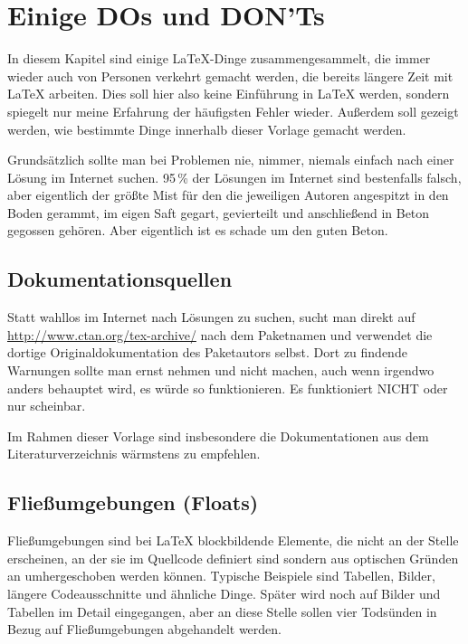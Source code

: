 \section{Einige DOs und DON'Ts}%
\label{sec:DOsAndDONTs}

In diesem Kapitel sind einige LaTeX-Dinge zusammengesammelt, die immer wieder
auch von Personen verkehrt gemacht werden, die bereits längere Zeit mit LaTeX
arbeiten. Dies soll hier also keine Einführung in LaTeX werden, sondern spiegelt
nur meine Erfahrung der häufigsten Fehler wieder. Außerdem soll gezeigt werden,
wie bestimmte Dinge innerhalb dieser Vorlage gemacht werden.

Grundsätzlich sollte man bei Problemen nie, nimmer, niemals einfach nach
einer Lösung im Internet suchen. 95\,\% der Lösungen im Internet sind
bestenfalls falsch, aber eigentlich der größte Mist für den die jeweiligen
Autoren angespitzt in den Boden gerammt, im eigen Saft gegart, gevierteilt und
anschließend in Beton gegossen gehören. Aber eigentlich ist es schade um den
guten Beton.

\subsection{Dokumentationsquellen}

Statt wahllos im Internet nach Lösungen zu suchen, sucht man direkt auf
\url{http://www.ctan.org/tex-archive/} nach dem Paketnamen und verwendet die
dortige Originaldokumentation des Paketautors selbst. Dort zu findende Warnungen
sollte man ernst nehmen und nicht machen, auch wenn irgendwo anders behauptet
wird, es würde so funktionieren. Es funktioniert NICHT oder nur scheinbar.

Im Rahmen dieser Vorlage sind insbesondere die Dokumentationen aus dem
Literaturverzeichnis wärmstens zu empfehlen.

\subsection{Fließumgebungen (Floats)}

Fließumgebungen sind bei LaTeX blockbildende Elemente,
die nicht an der Stelle erscheinen, an der sie im Quellcode definiert sind sondern aus optischen
Gründen an umhergeschoben werden können. Typische Beispiele sind Tabellen,
Bilder, längere Codeausschnitte und ähnliche Dinge. Später wird noch auf
Bilder und Tabellen im Detail eingegangen, aber an diese Stelle sollen vier
Todsünden in Bezug auf Fließumgebungen abgehandelt werden.

